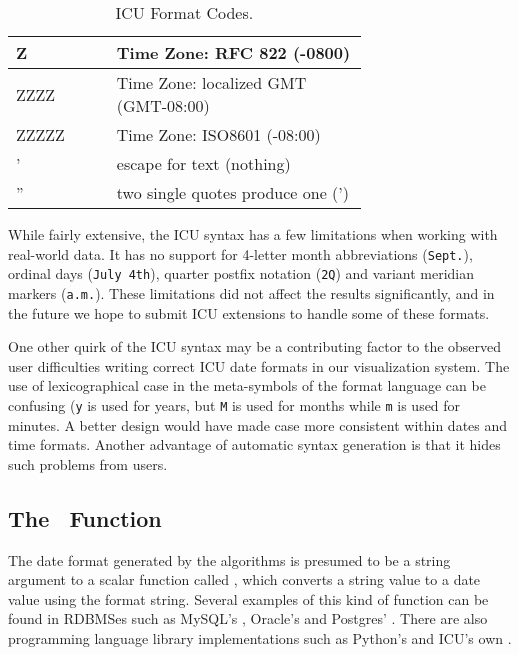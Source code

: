 \begin{table}[ht]
\begin{tabular}{|p{0.2\linewidth}| p{0.5\linewidth}|}
\scriptsize{Z} & \scriptsize{Time Zone: RFC 822 (-0800)}\\ \hline
\scriptsize{ZZZZ} & \scriptsize{Time Zone: localized GMT (GMT-08:00)}\\ \hline
\scriptsize{ZZZZZ} & \scriptsize{Time Zone: ISO8601 (-08:00)}\\ \hline
    
\scriptsize{'} & \scriptsize{escape for text (nothing)}\\ \hline
\scriptsize{''} & \scriptsize{two single quotes produce one (')}\\ \hline

\end{tabular}
\egroup
\caption{ICU Format Codes.}
\label{tab:icuformats}
\end{table}

While fairly extensive, the ICU syntax has a few limitations when working with real-world data. It has no support for 4-letter month abbreviations (\eg \texttt{Sept.}), ordinal days (\eg \texttt{July 4th}), quarter postfix notation (\eg \texttt{2Q}) and variant meridian markers (\eg \texttt{a.m.}). These limitations did not affect the results significantly, and in the future we hope to submit ICU extensions to handle some of these formats. 

One other quirk of the ICU syntax may be a contributing factor to the observed user difficulties writing correct ICU date formats in our visualization system. The use of lexicographical case in the meta-symbols of the format language can be confusing (\eg \texttt{y} is used for years, but \texttt{M} is used for months while \texttt{m} is used for minutes. A better design would have made case more consistent within dates and time formats. 
Another advantage of automatic syntax generation is that it hides such problems from users.

\subsection{The \dateparse\ Function}

The date format generated by the algorithms is presumed to be a string argument to a scalar function called \dateparse, which converts a string value to a date value using the format string. Several examples of this kind of function can be found in RDBMSes such as MySQL's , Oracle's  and Postgres' . There are also programming language library implementations such as Python's  and ICU's own .

